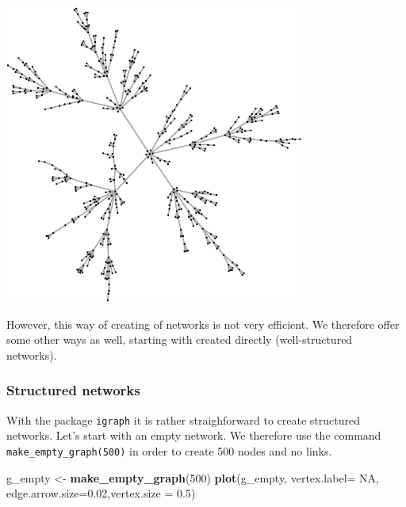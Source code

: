 \documentclass[]{article}
\newenvironment{Shaded}{\begin{snugshade}}{\end{snugshade}}
\newcommand{\KeywordTok}[1]{\textcolor[rgb]{0.13,0.29,0.53}{\textbf{#1}}}
\newcommand{\DataTypeTok}[1]{\textcolor[rgb]{0.13,0.29,0.53}{#1}}
\newcommand{\DecValTok}[1]{\textcolor[rgb]{0.00,0.00,0.81}{#1}}
\newcommand{\FloatTok}[1]{\textcolor[rgb]{0.00,0.00,0.81}{#1}}
\newcommand{\StringTok}[1]{\textcolor[rgb]{0.31,0.60,0.02}{#1}}
\newcommand{\OtherTok}[1]{\textcolor[rgb]{0.56,0.35,0.01}{#1}}
\newcommand{\NormalTok}[1]{#1}
\theoremstyle{definition}
\theoremstyle{definition}
\theoremstyle{definition}
\theoremstyle{remark}
\begin{document}
\includegraphics{ResearchTools_files/figure-latex/unnamed-chunk-56-1.pdf}

However, this way of creating of networks is not very efficient. We
therefore offer some other ways as well, starting with created directly
(well-structured networks).

\subsubsection{Structured networks}\label{structured-networks}

With the package \texttt{igraph} it is rather straighforward to create
structured networks. Let's start with an empty network. We therefore use
the command \texttt{make\_empty\_graph(500)} in order to create 500
nodes and no links.

\begin{Shaded}
\begin{Highlighting}[]
\NormalTok{g_empty <-}\StringTok{ }\KeywordTok{make_empty_graph}\NormalTok{(}\DecValTok{500}\NormalTok{)}
\KeywordTok{plot}\NormalTok{(g_empty, }\DataTypeTok{vertex.label=} \OtherTok{NA}\NormalTok{, }\DataTypeTok{edge.arrow.size=}\FloatTok{0.02}\NormalTok{,}\DataTypeTok{vertex.size =} \FloatTok{0.5}\NormalTok{)}
\end{Highlighting}
\end{Shaded}
\end{document}
